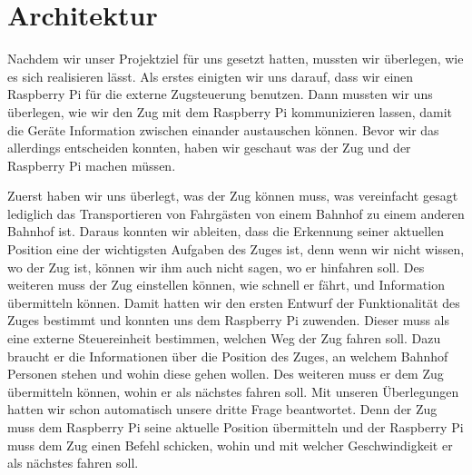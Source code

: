 \chapter{Architektur}
Nachdem wir unser Projektziel für uns gesetzt hatten, mussten wir überlegen, wie es sich realisieren lässt. Als erstes einigten wir uns darauf, dass wir einen Raspberry Pi für die externe Zugsteuerung benutzen. Dann mussten wir uns überlegen, wie wir den Zug mit dem Raspberry Pi kommunizieren lassen, damit die Geräte Information zwischen einander austauschen können. Bevor wir das allerdings entscheiden konnten, haben wir geschaut was der Zug und der Raspberry Pi machen müssen.

Zuerst haben wir uns überlegt, was der Zug können muss, was vereinfacht gesagt lediglich das Transportieren von Fahrgästen von einem Bahnhof zu einem anderen Bahnhof ist. Daraus konnten wir ableiten, dass die Erkennung seiner aktuellen Position eine der wichtigsten Aufgaben des Zuges ist, denn wenn wir nicht wissen, wo der Zug ist, können wir ihm auch nicht sagen, wo er hinfahren soll. Des weiteren muss der Zug einstellen können, wie schnell er fährt, und Information übermitteln können. Damit hatten wir den ersten Entwurf der Funktionalität des Zuges bestimmt und konnten uns dem Raspberry Pi zuwenden. Dieser muss als eine externe Steuereinheit bestimmen, welchen Weg der Zug fahren soll. Dazu braucht er die Informationen über die Position des Zuges, an welchem Bahnhof Personen stehen und wohin diese gehen wollen. Des weiteren muss er dem Zug übermitteln können, wohin er als nächstes fahren soll. Mit unseren Überlegungen hatten wir schon automatisch unsere dritte Frage beantwortet. Denn der Zug muss dem Raspberry Pi seine aktuelle Position übermitteln und der Raspberry Pi muss dem Zug einen Befehl schicken, wohin und mit welcher Geschwindigkeit er als nächstes fahren soll. 

